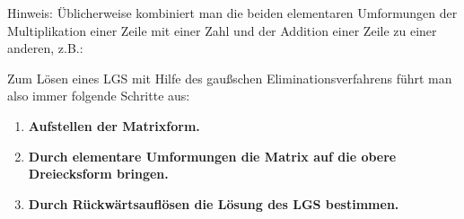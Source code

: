 Hinweis: Üblicherweise kombiniert man die beiden elementaren Umformungen der Multiplikation einer Zeile mit einer Zahl und der Addition einer Zeile zu einer anderen, z.B.:

\medskip

\begin{minipage}{\textwidth}
\end{minipage}

\bigskip

Zum Lösen eines LGS mit Hilfe des gaußschen Eliminationsverfahrens führt man also immer folgende Schritte aus:

\medskip

\begin{enumerate}
    \item \textbf{Aufstellen der Matrixform.}
    \item \textbf{Durch elementare Umformungen die Matrix auf die obere Dreiecksform bringen.}
    \item \textbf{Durch Rückwärtsauflösen die Lösung des LGS bestimmen.}
\end{enumerate}

